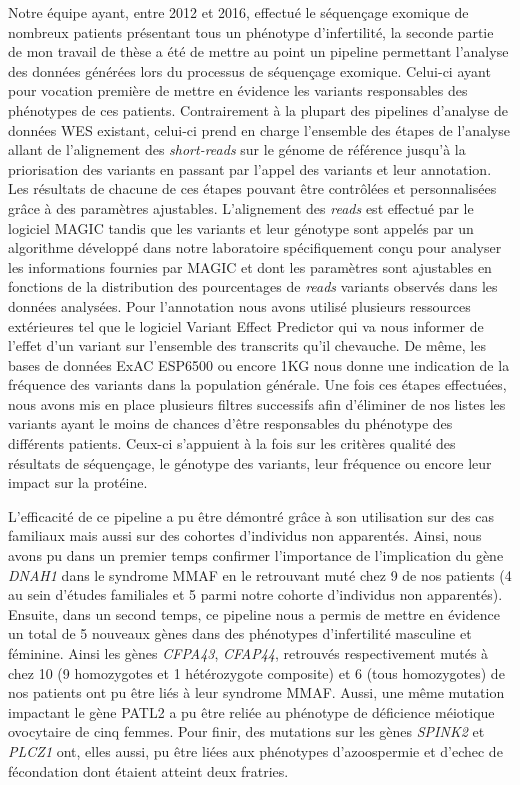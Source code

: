 \documentclass[12pt,twoside]{ugathesis}
\begin{document}
Notre équipe ayant, entre 2012 et 2016, effectué le séquençage exomique
de nombreux patients présentant tous un phénotype d'infertilité, la
seconde partie de mon travail de thèse a été de mettre au point un
pipeline permettant l'analyse des données générées lors du processus de
séquençage exomique. Celui-ci ayant pour vocation première de mettre en
évidence les variants responsables des phénotypes de ces patients.
Contrairement à la plupart des pipelines d'analyse de données WES
existant, celui-ci prend en charge l'ensemble des étapes de l'analyse
allant de l'alignement des \emph{short-reads} sur le génome de référence
jusqu'à la priorisation des variants en passant par l'appel des variants
et leur annotation. Les résultats de chacune de ces étapes pouvant être
contrôlées et personnalisées grâce à des paramètres ajustables.
L'alignement des \emph{reads} est effectué par le logiciel MAGIC tandis
que les variants et leur génotype sont appelés par un algorithme
développé dans notre laboratoire spécifiquement conçu pour analyser les
informations fournies par MAGIC et dont les paramètres sont ajustables
en fonctions de la distribution des pourcentages de \emph{reads}
variants observés dans les données analysées. Pour l'annotation nous
avons utilisé plusieurs ressources extérieures tel que le logiciel
Variant Effect Predictor qui va nous informer de l'effet d'un variant
sur l'ensemble des transcrits qu'il chevauche. De même, les bases de
données ExAC ESP6500 ou encore 1KG nous donne une indication de la
fréquence des variants dans la population générale. Une fois ces étapes
effectuées, nous avons mis en place plusieurs filtres successifs afin
d'éliminer de nos listes les variants ayant le moins de chances d'être
responsables du phénotype des différents patients. Ceux-ci s'appuient à
la fois sur les critères qualité des résultats de séquençage, le
génotype des variants, leur fréquence ou encore leur impact sur la
protéine.

L'efficacité de ce pipeline a pu être démontré grâce à son utilisation
sur des cas familiaux mais aussi sur des cohortes d'individus non
apparentés. Ainsi, nous avons pu dans un premier temps confirmer
l'importance de l'implication du gène \emph{DNAH1} dans le syndrome MMAF
en le retrouvant muté chez 9 de nos patients (4 au sein d'études
familiales et 5 parmi notre cohorte d'individus non apparentés).
Ensuite, dans un second temps, ce pipeline nous a permis de mettre en
évidence un total de 5 nouveaux gènes dans des phénotypes d'infertilité
masculine et féminine. Ainsi les gènes \emph{CFPA43}, \emph{CFAP44},
retrouvés respectivement mutés à chez 10 (9 homozygotes et 1
hétérozygote composite) et 6 (tous homozygotes) de nos patients ont pu
être liés à leur syndrome MMAF. Aussi, une même mutation impactant le
gène PATL2 a pu être reliée au phénotype de déficience méiotique
ovocytaire de cinq femmes. Pour finir, des mutations sur les gènes
\emph{SPINK2} et \emph{PLCZ1} ont, elles aussi, pu être liées aux
phénotypes d'azoospermie et d'echec de fécondation dont étaient atteint
deux fratries.
\end{document}
